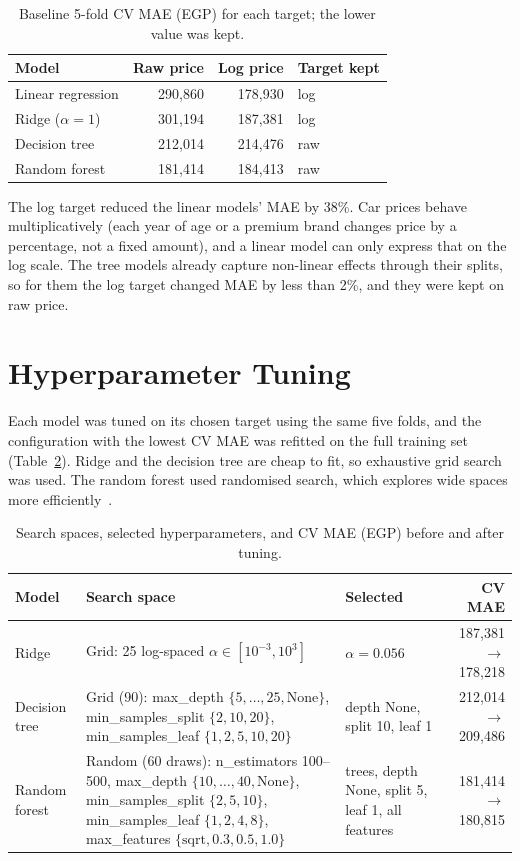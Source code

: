 \begin{table}[H]
\centering
\caption{Baseline 5-fold CV MAE (EGP) for each target; the lower value was kept.}
\label{tab:baseline}
\begin{tabular}{lrrl}
\toprule
Model & Raw price & Log price & Target kept \\
\midrule
Linear regression & 290,860 & 178,930 & log \\
Ridge ($\alpha=1$) & 301,194 & 187,381 & log \\
Decision tree & 212,014 & 214,476 & raw \\
Random forest & 181,414 & 184,413 & raw \\
\bottomrule
\end{tabular}
\end{table}

The log target reduced the linear models' MAE by 38\%. Car prices behave multiplicatively (each year of age or a premium brand changes price by a percentage, not a fixed amount), and a linear model can only express that on the log scale. The tree models already capture non-linear effects through their splits, so for them the log target changed MAE by less than 2\%, and they were kept on raw price.

\section{Hyperparameter Tuning}
Each model was tuned on its chosen target using the same five folds, and the configuration with the lowest CV MAE was refitted on the full training set (Table~\ref{tab:tuning}). Ridge and the decision tree are cheap to fit, so exhaustive grid search was used. The random forest used randomised search, which explores wide spaces more efficiently~\citep{bergstra2012}.

\begin{table}[H]
\centering
\small
\caption{Search spaces, selected hyperparameters, and CV MAE (EGP) before and after tuning.}
\label{tab:tuning}
\begin{tabular}{>{\raggedright\arraybackslash}p{2.1cm}>{\raggedright\arraybackslash}p{5.6cm}>{\raggedright\arraybackslash}p{3.3cm}r}
\toprule
Model & Search space & Selected & CV MAE \\
\midrule
Ridge & Grid: 25 log-spaced $\alpha \in [10^{-3}, 10^{3}]$ & $\alpha=0.056$ & 187,381 $\rightarrow$ 178,218 \\
Decision tree & Grid (90): max\_depth $\{5,\dots,25,\text{None}\}$, min\_samples\_split $\{2,10,20\}$, min\_samples\_leaf $\{1,2,5,10,20\}$ & depth None, split 10, leaf 1 & 212,014 $\rightarrow$ 209,486 \\
Random forest & Random (60 draws): n\_estimators 100--500, max\_depth $\{10,\dots,40,\text{None}\}$, min\_samples\_split $\{2,5,10\}$, min\_samples\_leaf $\{1,2,4,8\}$, max\_features $\{\text{sqrt},0.3,0.5,1.0\}$ & 330 trees, depth None, split 5, leaf 1, all features & 181,414 $\rightarrow$ 180,815 \\
\bottomrule
\end{tabular}
\end{table}

